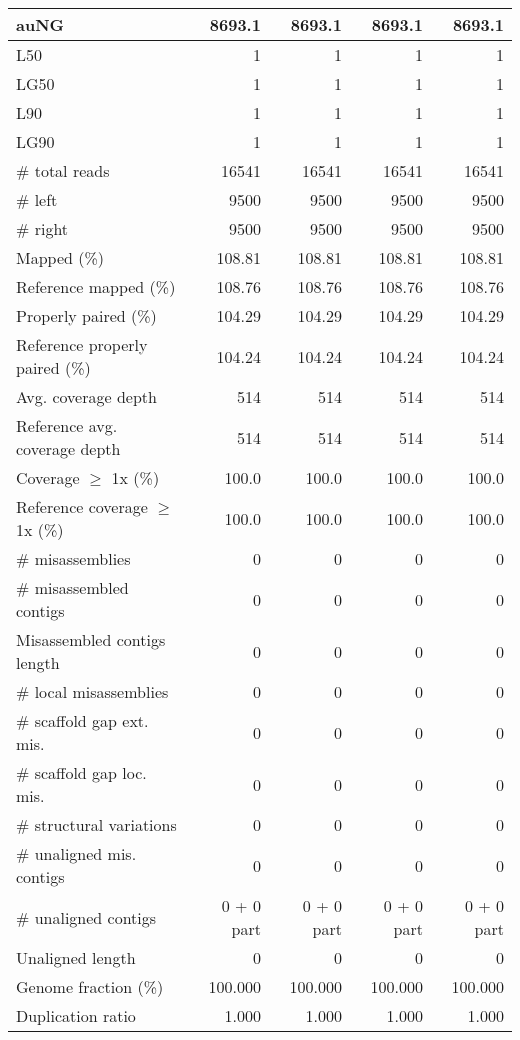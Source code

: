 \documentclass[12pt,a4paper]{article}
\begin{document}
\begin{table}[ht]
\begin{center}
\begin{tabular}{|l*{4}{|r}|}
auNG & 8693.1 & 8693.1 & 8693.1 & 8693.1 \\ \hline
L50 & 1 & 1 & 1 & 1 \\ \hline
LG50 & 1 & 1 & 1 & 1 \\ \hline
L90 & 1 & 1 & 1 & 1 \\ \hline
LG90 & 1 & 1 & 1 & 1 \\ \hline
\# total reads & 16541 & 16541 & 16541 & 16541 \\ \hline
\# left & 9500 & 9500 & 9500 & 9500 \\ \hline
\# right & 9500 & 9500 & 9500 & 9500 \\ \hline
Mapped (\%) & 108.81 & 108.81 & 108.81 & 108.81 \\ \hline
Reference mapped (\%) & 108.76 & 108.76 & 108.76 & 108.76 \\ \hline
Properly paired (\%) & 104.29 & 104.29 & 104.29 & 104.29 \\ \hline
Reference properly paired (\%) & 104.24 & 104.24 & 104.24 & 104.24 \\ \hline
Avg. coverage depth & 514 & 514 & 514 & 514 \\ \hline
Reference avg. coverage depth & 514 & 514 & 514 & 514 \\ \hline
Coverage $\geq$ 1x (\%) & 100.0 & 100.0 & 100.0 & 100.0 \\ \hline
Reference coverage $\geq$ 1x (\%) & 100.0 & 100.0 & 100.0 & 100.0 \\ \hline
\# misassemblies & 0 & 0 & 0 & 0 \\ \hline
\# misassembled contigs & 0 & 0 & 0 & 0 \\ \hline
Misassembled contigs length & 0 & 0 & 0 & 0 \\ \hline
\# local misassemblies & 0 & 0 & 0 & 0 \\ \hline
\# scaffold gap ext. mis. & 0 & 0 & 0 & 0 \\ \hline
\# scaffold gap loc. mis. & 0 & 0 & 0 & 0 \\ \hline
\# structural variations & 0 & 0 & 0 & 0 \\ \hline
\# unaligned mis. contigs & 0 & 0 & 0 & 0 \\ \hline
\# unaligned contigs & 0 + 0 part & 0 + 0 part & 0 + 0 part & 0 + 0 part \\ \hline
Unaligned length & 0 & 0 & 0 & 0 \\ \hline
Genome fraction (\%) & 100.000 & 100.000 & 100.000 & 100.000 \\ \hline
Duplication ratio & 1.000 & 1.000 & 1.000 & 1.000 \\ \hline

\end{tabular}
\end{center}
\end{table}
\end{document}
